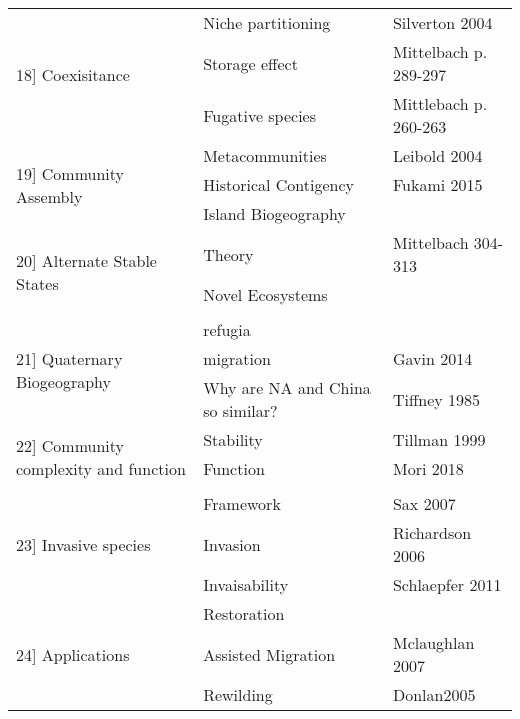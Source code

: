 \documentclass{article}
\begin{document}
{\begin{tabularx}{\columnwidth}{|p{4cm}|p{9cm}|p{5cm}|}
\hline
\multirow{3}{10em}{18] Coexisitance } & Niche partitioning  & Silverton 2004 \\
& Storage effect &  Mittelbach p. 289-297  \\ 
& Fugative species & Mittlebach p. 260-263 \\ 
\hline
\multirow{3}{10em}{19] Community Assembly} & Metacommunities  & Leibold 2004 \\
& Historical Contigency &  Fukami 2015 \\ 
& Island Biogeography &  \\ 
\hline
\multirow{3}{10em}{20] Alternate Stable States} & Theory  & Mittelbach 304-313\\
& Novel Ecosystems &   \\ 
&  &  \\ 
\hline
\multirow{3}{10em}{21] Quaternary Biogeography} & refugia  &  \\
& migration &  Gavin 2014 \\ 
& Why are NA and China so similar? &  Tiffney 1985 \\ 
\hline
\multirow{3}{10em}{22] Community complexity and function} & Stability  & Tillman 1999 \\
& Function &  Mori 2018 \\ 
&  &  \\ 
\hline
\multirow{3}{10em}{23] Invasive species} & Framework & Sax 2007 \\
& Invasion &  Richardson 2006 \\ 
& Invaisability & Schlaepfer 2011  \\ 
\hline
\multirow{3}{10em}{24] Applications } & Restoration & \\
& Assisted Migration & Mclaughlan 2007  \\ 
& Rewilding & Donlan2005 \\ 
\hline
\end{tabularx}
}
\end{document}
